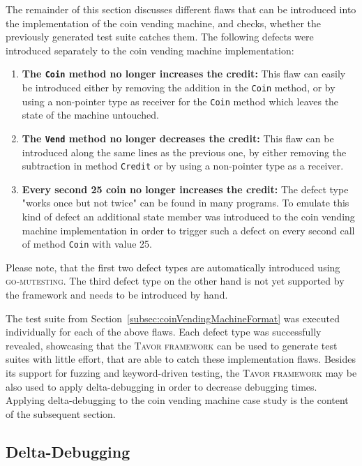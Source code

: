 The remainder of this section discusses different flaws that can be introduced into the implementation of the coin vending machine, and checks, whether the previously generated test suite catches them. The following defects were introduced separately to the coin vending machine implementation:
\begin{enumerate}
\item \textbf{The \texttt{Coin} method no longer increases the credit:} This flaw can easily be introduced either by removing the addition in the \texttt{Coin} method, or by using a non-pointer type as receiver for the \texttt{Coin} method which leaves the state of the machine untouched.
\item \textbf{The \texttt{Vend} method no longer decreases the credit:} This flaw can be introduced along the same lines as the previous one, by either removing the subtraction in method \texttt{Credit} or by using a non-pointer type as a receiver.
\item \textbf{Every second 25 coin no longer increases the credit:} The defect type "works once but not twice" can be found in many programs. To emulate this kind of defect an additional state member was introduced to the coin vending machine implementation in order to trigger such a defect on every second call of method \texttt{Coin} with value 25.
\end{enumerate}

Please note, that the first two defect types are automatically introduced using \textsc{go-mutesting}. The third defect type on the other hand is not yet supported by the framework and needs to be introduced by hand.

The test suite from Section~\ref{subsec:coinVendingMachineFormat} was executed individually for each of the above flaws. Each defect type was successfully revealed, showcasing that the \textsc{Tavor framework} can be used to generate test suites with little effort, that are able to catch these implementation flaws. Besides its support for fuzzing and keyword-driven testing, the \textsc{Tavor framework} may be also used to apply delta-debugging in order to decrease debugging times. Applying delta-debugging to the coin vending machine case study is the content of the subsequent section.

\subsection{Delta-Debugging}
\label{subsec:coinVendingMachineMutationDeltaDebugging}

